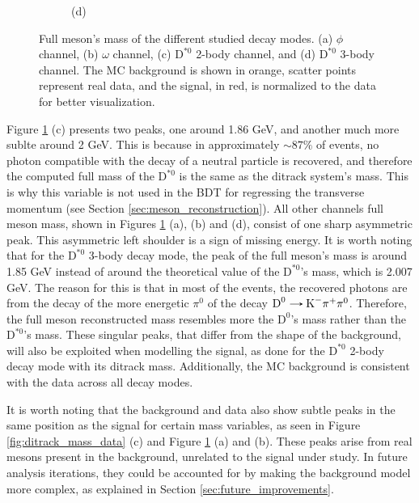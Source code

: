 \begin{figure}[!ht]
\begin{subfigure}[t]{0.50\mylength}
        \vspace*{-0.2cm}
        \caption{\footnotesize (d)}
    \end{subfigure}%
\caption{Full meson's mass of the different studied decay modes. (a) $\phi$ channel, (b) $\omega$ channel, (c) $\text{D}^{*0}$ 2-body channel, and (d) $\text{D}^{*0}$ 3-body channel. The MC background is shown in orange, scatter points represent real data, and the signal, in red, is normalized to the data for better visualization.}
\label{fig:full_mass_data}
    \vspace*{-0.0cm}
\end{figure}
Figure \ref{fig:full_mass_data} (c) presents two peaks, one around 1.86 GeV, and another much more sublte around 2 GeV. This is because in approximately $\sim 87\%$ of events, no photon compatible with the decay of a neutral particle is recovered, and therefore the computed full mass of the $\text{D}^{*0}$ is the same as the ditrack system's mass. This is why this variable is not used in the BDT for regressing the transverse momentum (see Section \ref{sec:meson_reconstruction}). All other channels full meson mass, shown in Figures \ref{fig:full_mass_data} (a), (b) and (d), consist of one sharp asymmetric peak. This asymmetric left shoulder is a sign of missing energy. It is worth noting that for the $\text{D}^{*0}$ 3-body decay mode, the peak of the full meson's mass is around 1.85 GeV instead of around the theoretical value of the $\text{D}^{*0}$'s mass, which is 2.007 GeV. The reason for this is that in most of the events, the recovered photons are from the decay of the more energetic $\pi^0$ of the decay $\text{D}^{0}\decaysto \text{K}^{-}\pi^{+}\pi^0$. Therefore, the full meson reconstructed mass resembles more the $\text{D}^{0}$'s mass rather than the $\text{D}^{*0}$'s mass. These singular peaks, that differ from the shape of the background, will also be exploited when modelling the signal, as done for the $\text{D}^{*0}$ 2-body decay mode with its ditrack mass. Additionally, the MC background is consistent with the data across all decay modes.

It is worth noting that the background and data also show subtle peaks in the same position as the signal for certain mass variables, as seen in Figure \ref{fig:ditrack_mass_data} (c) and Figure \ref{fig:full_mass_data} (a) and (b). These peaks arise from real mesons present in the background, unrelated to the signal under study. In future analysis iterations, they could be accounted for by making the background model more complex, as explained in Section \ref{sec:future_improvements}.

